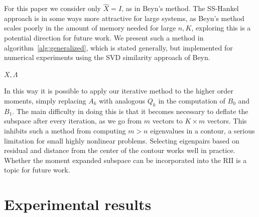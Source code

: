 \documentclass[onefignum,onetabnum]{siamart190516}
\begin{document}
For this paper we consider only \( \widehat{X} = I \), as in Beyn's method.
The SS-Hankel approach is in some ways more attractive for large systems, as Beyn's method scales poorly in the amount of memory needed for large \( n, K \), exploring this is a potential direction for future work.
We present such a method in algorithm~\ref{alg:generalized}, which is stated generally, but implemented for numerical experiments using the SVD similarity approach of Beyn.

\begin{algorithm}
\caption{Hybrid Algorithm with Higher Moments}
\label{alg:generalized}
\begin{algorithmic}
	\ENDWHILE
	\RETURN \( X, \Lambda \)
\end{algorithmic}
\end{algorithm}

In this way it is possible to apply our iterative method to the higher order moments, simply replacing \( A_k \) with analogous \( Q_k \) in the computation of \( B_0 \) and \( B_1 \).
The main difficulty in doing this is that it becomes necessary to deflate the subspace after every iteration, as we go from \( m \) vectors to \( K \times m \) vectors.
This inhibits such a method from computing \( m > n \) eigenvalues in a contour, a serious limitation for small highly nonlinear problems.
Selecting eigenpairs based on residual and distance from the center of the contour works well in practice. 
Whether the moment expanded subspace can be incorporated into the RII is a topic for future work.

\section{Experimental results}
\label{sec:experiments}
\end{document}

